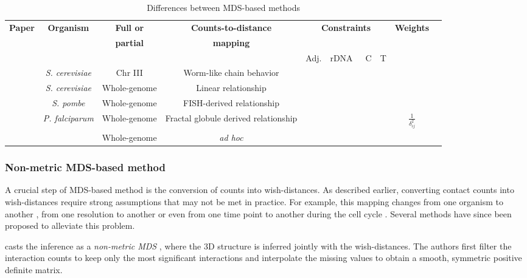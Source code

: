 \documentclass[letterpaper,12pt]{article}
\newcommand*\CHECK{\ding{51}}
\begin{document}
\begin{table*}
\scriptsize
\centering
\begin{tabular}{rccccccccc}
\hline
\multirow{2}{*}{\textbf{Paper}} & \multirow{2}{*}{\textbf{Organism}} &
\textbf{Full or}
& \textbf{Counts-to-distance} &
\multicolumn{4}{c}{\multirow{2}{*}{\textbf{Constraints}}}
& \multirow{2}{*}{\textbf{Weights}}\\
 & & \textbf{partial} & \textbf{mapping} &  \\
 \cmidrule(lr){5-8} 
 & & & & Adj. & rDNA & C & T & \\
\hline
\cite{dekker:capturing} & {\em S. cerevisiae} & Chr III & Worm-like chain
behavior & & & & \\
\cite{duan:three-dimensional} & {\em S. cerevisiae} & Whole-genome & Linear
relationship & \CHECK &  \CHECK & \CHECK &  & \\
\cite{tanizawa:mapping} & {\em S. pombe} & Whole-genome &
FISH-derived relationship & \CHECK & \CHECK & \CHECK & \CHECK &  \\
\cite{ay:three-dimensional} & {\em P. falciparum} & Whole-genome & Fractal
globule derived relationship & \CHECK  & & &
 & $\frac{1}{\delta_{ij}^2}$ \\
\cite{lesne:3d} & & Whole-genome & \textit{ad hoc} & & & & & \
\end{tabular}
\caption{Differences between MDS-based methods}{}
\label{table:mds_detail}
\end{table*}


\subsubsection*{Non-metric MDS-based method}

A crucial step of MDS-based method is the conversion of counts into
wish-distances. As described earlier, converting contact counts into
wish-distances require strong assumptions that may not be met in practice. For
example, this mapping changes from one organism to another
\citep{fudenberg:higher-order}, from one resolution to another
\citep{zhang:inference} or even from one time point to another during the cell
cycle \citep{le:high-resolution, ay:three-dimensional}. Several methods have
since been proposed to alleviate this problem.

\citet{ben-elazar:spatial} casts the inference as a \emph{non-metric MDS}
\citep{kruskal:multidimensional}, where the 3D structure is inferred jointly
with the wish-distances. The authors first filter the
interaction counts to keep only the most significant interactions and
interpolate the missing values to obtain a smooth, symmetric positive definite
matrix.
\end{document}

